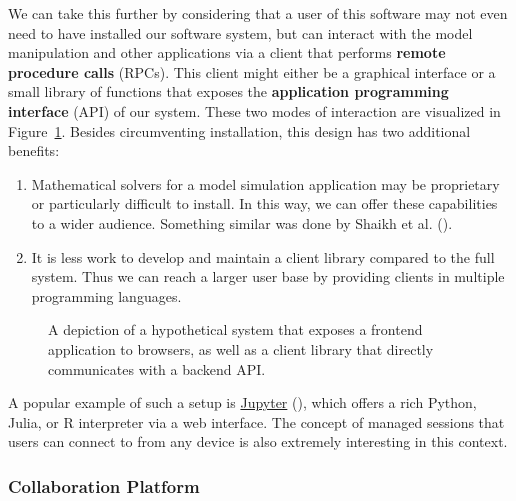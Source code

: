 \documentclass[
  a4paper,
]{scrartcl}
\makeatletter
\newcommand*\pandocbounded[1]{%
  \sbox\pandoc@box{#1}%
  \Gscale@div\@tempa{\textheight}{\dimexpr\ht\pandoc@box+\dp\pandoc@box\relax}%
  \Gscale@div\@tempb{\linewidth}{\wd\pandoc@box}%
  \ifdim\@tempb\p@<\@tempa\p@\let\@tempa\@tempb\fi%
  \ifdim\@tempa\p@<\p@\scalebox{\@tempa}{\usebox\pandoc@box}%
  \else\usebox{\pandoc@box}%
  \fi%
}
\providecommand{\tightlist}{%
  \setlength{\itemsep}{0pt}\setlength{\parskip}{0pt}}
\makeatother
\begin{document}
We can take this further by considering that a user of this software may
not even need to have installed our software system, but can interact
with the model manipulation and other applications via a client that
performs \textbf{remote procedure calls} (RPCs). This client might
either be a graphical interface or a small library of functions that
exposes the \textbf{application programming interface} (API) of our
system. These two modes of interaction are visualized in
Figure~\ref{fig-escsbs}. Besides circumventing installation, this design
has two additional benefits:

\begin{enumerate}
\def\labelenumi{\arabic{enumi}.}
\tightlist
\item
  Mathematical solvers for a model simulation application may be
  proprietary or particularly difficult to install. In this way, we can
  offer these capabilities to a wider audience. Something similar was
  done by Shaikh et al.
  ().
\item
  It is less work to develop and maintain a client library compared to
  the full system. Thus we can reach a larger user base by providing
  clients in multiple programming languages.
\end{enumerate}

\begin{figure}

\centering{

\pandocbounded{\texttt{[image: escsbs.pdf]}}

}

\caption{\label{fig-escsbs}A depiction of a hypothetical system that
exposes a frontend application to browsers, as well as a client library
that directly communicates with a backend API.}

\end{figure}%

A popular example of such a setup is
\href{https://jupyter.org/}{Jupyter}
(), which offers a rich Python, Julia, or R interpreter via a web
interface. The concept of managed sessions that users can connect to
from any device is also extremely interesting in this context.

\subsubsection{Collaboration Platform}\label{collaboration-platform}
\end{document}
